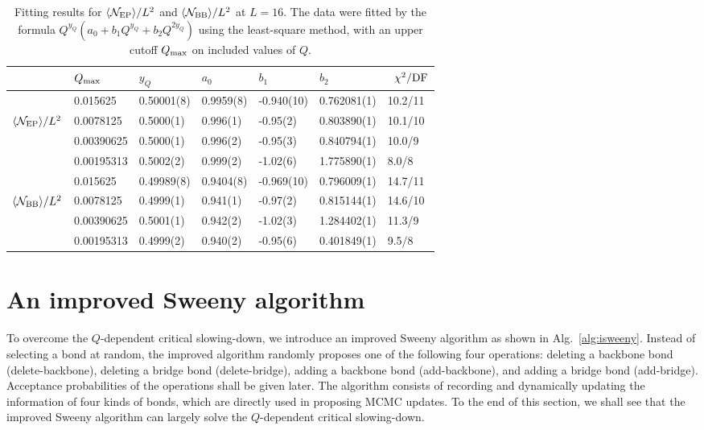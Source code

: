 \documentclass[aps,pre,twocolumn,superscriptaddress,longbibliography,floatfix]{revtex4-2}
\begin{document}
\begin{table*}
\caption{\label{table1}
Fitting results for $\langle \mathcal{N}_{\rm EP} \rangle /L^2$ and $\langle \mathcal{N}_{\rm BB} \rangle /L^2$ at $L=16$. The data were fitted by the formula $Q^{y_Q}(a_0+b_1Q^{y_Q}+b_2Q^{2y_Q})$ 
using the least-square method, with an upper cutoff $Q_{\rm max}$ on included values of $Q$.
}
\begin{ruledtabular}
\begin{tabular}{lllllll}
 
&\quad$Q_{\rm max}$  	&\quad$y_Q$ 	&\quad$a_0$ 	&\quad$b_1$ 	&\quad$b_2$	&\ 
$\chi^2/{\rm DF}$ 	\\
\hline 
&0.015625       &0.50001(8)	&0.9959(8) 	&-0.940(10)	&0.762081(1)	&10.2/11\\ 

$\langle \mathcal{N}_{\rm EP} \rangle /L^2$  &0.0078125     &0.5000(1) 	&0.996(1)  	&-0.95(2)  	&0.803890(1)	&10.1/10\\ 

&0.00390625     &0.5000(1) 	&0.996(2)  	&-0.95(3)  	&0.840794(1)	&10.0/9\\ 

&0.00195313     &0.5002(2) 	&0.999(2)  	&-1.02(6)  	&1.775890(1)	&8.0/8\\ 
\cline{1-7}
&0.015625     &0.49989(8)	&0.9404(8) 	&-0.969(10)	&0.796009(1)	&14.7/11\\ 

$\langle \mathcal{N}_{\rm BB} \rangle /L^2$ &0.0078125     &0.4999(1) 	&0.941(1)  	&-0.97(2)  	&0.815144(1)	&14.6/10\\ 

&0.00390625     &0.5001(1) 	&0.942(2)  	&-1.02(3)  	&1.284402(1)	&11.3/9\\ 

&0.00195313    &0.4999(2) 	&0.940(2)  	&-0.95(6)  	&0.401849(1)	&9.5/8\\ 
\end{tabular} 
\end{ruledtabular}
\end{table*}

\section{\label{sec3}An improved Sweeny algorithm}

To overcome the $Q$-dependent critical slowing-down, we introduce an improved Sweeny algorithm as shown in Alg.~\ref{alg:isweeny}.
Instead of selecting a bond at random, the improved algorithm randomly proposes one of the following four operations: deleting a backbone bond ({\sffamily delete-backbone}), deleting a bridge bond ({\sffamily delete-bridge}),
adding a backbone bond ({\sffamily add-backbone}), and adding a bridge bond ({\sffamily add-bridge}). 
Acceptance probabilities of the operations shall be given later.
The algorithm consists of recording and dynamically updating the information of four kinds of bonds, which are directly used in proposing MCMC updates.
To the end of this section, we shall see that the improved Sweeny algorithm can largely solve the $Q$-dependent critical slowing-down.
\end{document}
